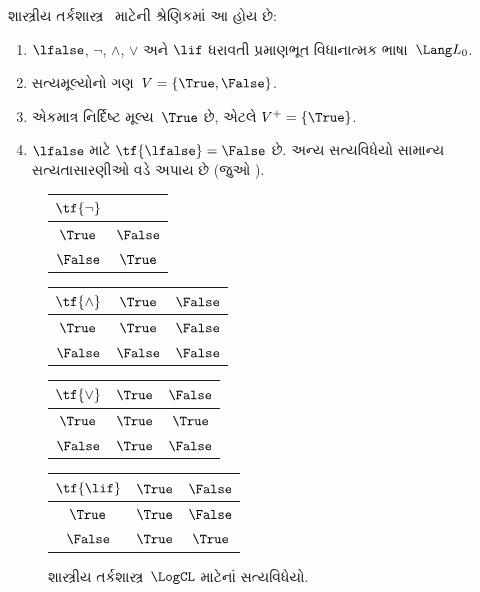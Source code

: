 \documentclass[../../../include/open-logic-section]{subfiles}
\begin{document}
\begin{ex}
શાસ્ત્રીય તર્કશાસ્ત્ર~\LogCL{} માટેની શ્રેણિકમાં આ હોય છે:
\begin{enumerate}
  \item $\lfalse$, $\lnot$, $\land$, $\lor$ અને $\lif$
  ધરાવતી પ્રમાણભૂત વિધાનાત્મક ભાષા~$\Lang L_0$.
  \item સત્યમૂલ્યોનો ગણ~$V = \{\True, \False\}$.
  \item એકમાત્ર નિર્દિષ્ટ મૂલ્ય~$\True$ છે, એટલે
  $V^+ = \{\True\}$.
  \item $\lfalse$ માટે $\tf{\lfalse} = \False$ છે.
  અન્ય સત્યવિધેયો સામાન્ય સત્યતાસારણીઓ વડે
  અપાય છે (જુઓ ).
\end{enumerate}
\begin{figure}
  \begin{center}
      \begin{tabular}{c|c}
        $\tf{\lnot}$ & \\
        \hline
        $\True$ & $\False$ \\
        $\False$ & $\True$
      \end{tabular}
      \quad
      \begin{tabular}{c|cc}
        $\tf{\land}$ & $\True$ & $\False$ \\
        \hline
        $\True$ & $\True$ & $\False$ \\
        $\False$ & $\False$ & $\False$
      \end{tabular}
      \quad
      \begin{tabular}{c|cc}
        $\tf{\lor}$ & $\True$ & $\False$ \\
        \hline
        $\True$ & $\True$ & $\True$ \\
        $\False$ & $\True$ & $\False$
      \end{tabular}
      \quad
      \begin{tabular}{c|cc}
        $\tf{\lif}$ & $\True$ & $\False$ \\
        \hline
        $\True$ & $\True$ & $\False$ \\
        $\False$ & $\True$ & $\True$
      \end{tabular}
    \end{center}
    \caption{શાસ્ત્રીય તર્કશાસ્ત્ર~$\LogCL$ માટેનાં સત્યવિધેયો.}
  \end{figure}
  \end{ex}
\end{document}

